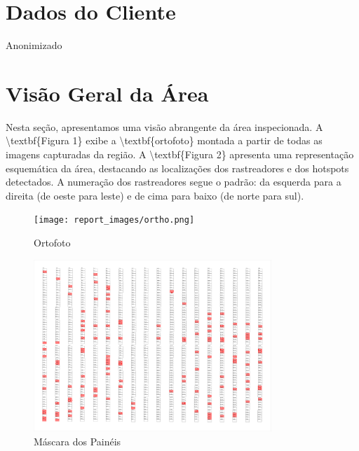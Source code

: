 \documentclass[dvipsnames]{article}%
\begin{document}
\section{Dados do Cliente}%
Anonimizado%
\section{Visão Geral da Área}%
 Nesta seção, apresentamos uma visão abrangente da área inspecionada. A \textbackslash{}textbf\{Figura 1\} exibe a \textbackslash{}textbf\{ortofoto\} montada a partir de todas as imagens capturadas da região. A \textbackslash{}textbf\{Figura 2\} apresenta uma representação esquemática da área, destacando as localizações dos rastreadores e dos hotspots detectados. A numeração dos rastreadores segue o padrão: da esquerda para a direita (de oeste para leste) e de cima para baixo (de norte para sul).%
\FloatBarrier%


\begin{figure}[h!]%
\centering%
\texttt{[image: report\_images/ortho.png]}%
\caption{Ortofoto}%
\end{figure}

%
\FloatBarrier%


\begin{figure}[h!]%
\centering%
\includegraphics[width=0.8\textwidth]{report_images/layer_img.pdf}%
\caption{Máscara dos Painéis}%
\end{figure}

%
\FloatBarrier%
\end{document}
